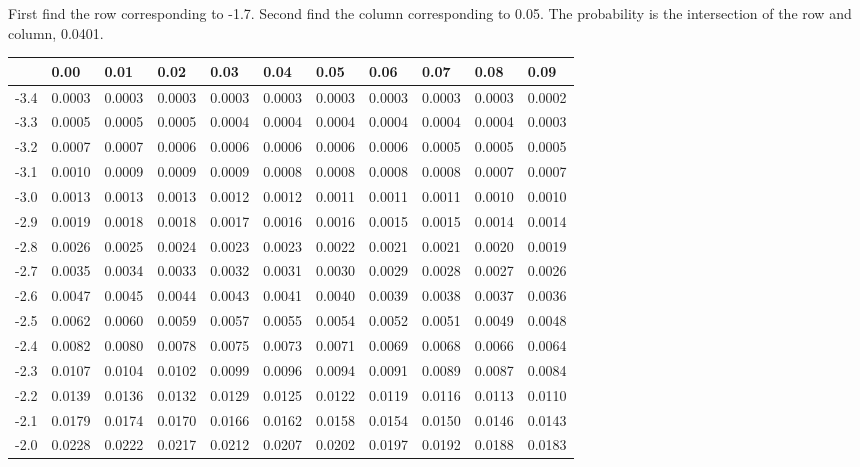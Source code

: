 \begin{frame} {\small First find the row corresponding to -1.7. Second
    find the column corresponding to 0.05. The probability is the
    intersection of the row and column, 0.0401.}

  {
\fontsize{5pt}{5pt}
\selectfont

\begin{tabular}{l|lllll>{\columncolor{light-blue}}lllll}
     & 0.00   & 0.01   & 0.02   & 0.03   &  0.04   & 0.05   & 0.06   & 0.07   & 0.08  & 0.09 \\ \hline
-3.4 & 0.0003 & 0.0003 & 0.0003 & 0.0003 & 0.0003 & 0.0003 & 0.0003 & 0.0003 & 0.0003 & 0.0002 \\ 
-3.3 & 0.0005 & 0.0005 & 0.0005 & 0.0004 & 0.0004 & 0.0004 & 0.0004 & 0.0004 & 0.0004 & 0.0003 \\ 
-3.2 & 0.0007 & 0.0007 & 0.0006 & 0.0006 & 0.0006 & 0.0006 & 0.0006 & 0.0005 & 0.0005 & 0.0005 \\ 
-3.1 & 0.0010 & 0.0009 & 0.0009 & 0.0009 & 0.0008 & 0.0008 & 0.0008 & 0.0008 & 0.0007 & 0.0007 \\ 
-3.0 & 0.0013 & 0.0013 & 0.0013 & 0.0012 & 0.0012 & 0.0011 & 0.0011 & 0.0011 & 0.0010 & 0.0010 \\ 
-2.9 & 0.0019 & 0.0018 & 0.0018 & 0.0017 & 0.0016 & 0.0016 & 0.0015 & 0.0015 & 0.0014 & 0.0014 \\ 
-2.8 & 0.0026 & 0.0025 & 0.0024 & 0.0023 & 0.0023 & 0.0022 & 0.0021 & 0.0021 & 0.0020 & 0.0019 \\ 
-2.7 & 0.0035 & 0.0034 & 0.0033 & 0.0032 & 0.0031 & 0.0030 & 0.0029 & 0.0028 & 0.0027 & 0.0026 \\ 
-2.6 & 0.0047 & 0.0045 & 0.0044 & 0.0043 & 0.0041 & 0.0040 & 0.0039 & 0.0038 & 0.0037 & 0.0036 \\ 
-2.5 & 0.0062 & 0.0060 & 0.0059 & 0.0057 & 0.0055 & 0.0054 & 0.0052 & 0.0051 & 0.0049 & 0.0048 \\ 
-2.4 & 0.0082 & 0.0080 & 0.0078 & 0.0075 & 0.0073 & 0.0071 & 0.0069 & 0.0068 & 0.0066 & 0.0064 \\ 
-2.3 & 0.0107 & 0.0104 & 0.0102 & 0.0099 & 0.0096 & 0.0094 & 0.0091 & 0.0089 & 0.0087 & 0.0084 \\ 
-2.2 & 0.0139 & 0.0136 & 0.0132 & 0.0129 & 0.0125 & 0.0122 & 0.0119 & 0.0116 & 0.0113 & 0.0110 \\ 
-2.1 & 0.0179 & 0.0174 & 0.0170 & 0.0166 & 0.0162 & 0.0158 & 0.0154 & 0.0150 & 0.0146 & 0.0143 \\ 
-2.0 & 0.0228 & 0.0222 & 0.0217 & 0.0212 & 0.0207 & 0.0202 & 0.0197 & 0.0192 & 0.0188 & 0.0183 \\ 

\end{tabular}}
\end{frame}
